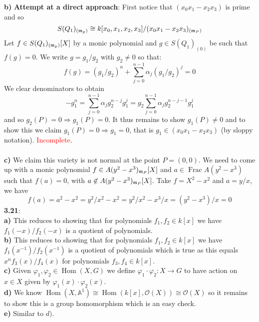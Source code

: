 \documentclass[12pt]{article}
\numberwithin{thm}{subsection}
\numberwithin{defn}{subsection}
\numberwithin{lemma}{subsection}
\numberwithin{example}{subsection}
\numberwithin{notation}{subsection}
\numberwithin{cor}{subsection}
\numberwithin{remark}{subsection}
\numberwithin{condition}{subsection}
\numberwithin{question}{subsection}
\numberwithin{construction}{subsection}
\numberwithin{construction}{subsection}
\numberwithin{construction}{subsection}
\newcommand{\bb}[1]{\mathbb{#1}}
\newcommand{\call}[1]{\mathcal{#1}}
\begin{document}
%
\textbf{b)} 
\textbf{Attempt at a direct approach}: First notice that $(x_0x_1 - x_2x_3)$ is prime and so 
\begin{equation}
S(Q_1)_{(\frak{m}_p)} \cong k[x_0,x_1,x_2,x_3]/(x_0x_1 - x_2x_3)_{(\frak{m}_P)}
\end{equation}
Let $f \in S(Q_1)_{(\frak{m}_p)}[X]$ by a monic polynomial and $g \in S(Q_1)_{(0)}$ be such that $f(g) = 0$. We write $g = g_1/g_2$ with $g_2 \neq 0$ so that:
\[f(g) = (g_1/g_2)^n + \sum_{j = 0}^{n-1}\alpha_j (g_1/g_2)^j = 0\]
We clear denominators to obtain
\[-g_1^n = \sum_{j = 0}^{n-1}\alpha_j g_2^{n-j}g_1^j = g_2\sum_{j=0}^{n-1}\alpha_j g_2^{n-j-1}g_1^j\]
and so $g_2(P) = 0 \Rightarrow g_1(P) = 0$. It thus remains to show $g_1(P) \neq 0$ and to show this we claim $g_1(P) = 0 \Rightarrow g_1 = 0$, that is $g_1 \in (x_0x_1 - x_2x_3)$ (by sloppy notation). \textcolor{red}{Incomplete}.\\\\
%
\textbf{c)} We claim this variety is not normal at the point $P = (0,0)$. We need to come up with a monic polynomial $f \in A(y^2 - x^3)_{\frak{m}_P}[X]$ and $a \in \operatorname{Frac}A(y^2 - x^3)$ such that $f(a) = 0$, with $a \not\in A(y^2 - x^3)_{\frak{m}_P}[X]$. Take $f = X^2 - x^2$ and $a = y/x$, we have
\[f(a) = a^2 - x^2 = y^2/x^2 - x^2 = y^2/x^2 - x^3/x = (y^2 - x^3)/x = 0\]
\textbf{3.21}:\\
\textbf{a)} This reduces to showing that for polynomials $f_1,f_2 \in k[x]$ we have $f_1(-x)/f_2(-x)$ is a quotient of polynomials.\\
\textbf{b)} This reduces to showing that for polynomials $f_1,f_2 \in k[x]$ we have $f_1(x^{-1})/f_2(x^{-1})$ is a quotient of polynomials which is true as this equals $x^n f_3(x)/f_4(x)$ for polynomials $f_3,f_4 \in k[x]$.\\
\textbf{c)} Given $\varphi_1,\varphi_2 \in \operatorname{Hom}(X,G)$ we define $\varphi_1\cdot\varphi_2: X \to G$ to have action on $x \in X$ given by $\varphi_1(x)\cdot\varphi_2(x)$.\\
\textbf{d)} We know $\operatorname{Hom}(X,\bb{A}^1) \cong \operatorname{Hom}(k[x], \call{O}(X)) \cong \call{O}(X)$ so it remains to show this is a group homomorphism which is an easy check.\\
\textbf{e)} Similar to $d)$.
%
\end{document}
